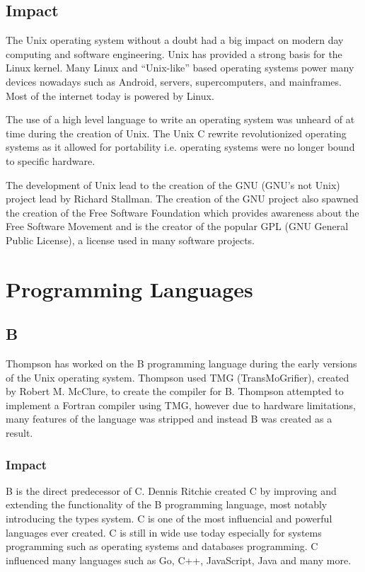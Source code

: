 \documentclass{article}
\begin{document}
\subsection{Impact}
The Unix operating system without a doubt had a big impact on modern day
computing and software engineering. Unix has provided a strong basis for the
Linux kernel. Many Linux and ``Unix-like'' based operating systems power many
devices nowadays such as Android, servers, supercomputers, and mainframes. Most
of the internet today is powered by Linux.

The use of a high level language to write an operating system was unheard of at
time during the creation of Unix. The Unix C rewrite revolutionized operating
systems as it allowed for portability i.e. operating systems were no longer
bound to specific hardware.

The development of Unix lead to the creation of the GNU (GNU's not Unix)
project lead by Richard Stallman. The creation of the GNU project also spawned
the creation of the Free Software Foundation which provides awareness about the
Free Software Movement and is the creator of the popular GPL (GNU General
Public License), a license used in many software projects.

\section{Programming Languages}
\subsection{B}
Thompson has worked on the B programming language during the early versions of
the Unix operating system. Thompson used TMG (TransMoGrifier), created by
Robert M. McClure, to create the compiler for B.  Thompson attempted to
implement a Fortran compiler using TMG, however due to hardware limitations,
many features of the language was stripped and instead B was created as a
result.\cite{VCF}

\subsubsection{Impact}
B is the direct predecessor of C. Dennis Ritchie created C by improving and
extending the functionality of the B programming language, most notably
introducing the types system. C is one of the most influencial and powerful
languages ever created. C is still in wide use today especially for systems
programming such as operating systems and databases programming. C influenced
many languages such as Go, C++, JavaScript, Java and many more.
\end{document}
